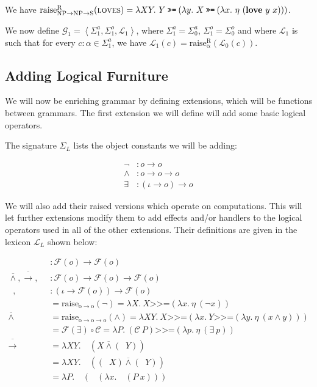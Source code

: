 \documentclass{article}
\newcommand{\hsbind}{\mathbin{\texttt{>>=}}}
\newcommand{\abs}[1]{\textsc{#1}}
\newcommand{\obj}[1]{\textbf{#1}}
\newcommand{\dand}{\mathbin{\overline{\land}}}
\newcommand{\dnot}{\mathop{\overline{\lnot}}}
\newcommand{\dor}{\mathop{\overline{\lor}}}
\newcommand{\dimpl}{\mathbin{\overline{\to}}}
\newcommand{\dexists}{\mathop{\overline{\exists}}}
\newcommand{\dforall}{\mathop{\overline{\forall}}}
\begin{document}
We have $\mathrm{raise^R_{NP \to NP \to S}}(\abs{loves}) = \lambda X
Y.\ Y \hsbind (\lambda y.\ X \hsbind (\lambda
x.\ \eta\ (\obj{love}\ y\ x)))$.

We now define $\mathcal{G}_1 = \left< \Sigma^a_1, \Sigma^o_1, \mathcal{L}_1
\right>$, where $\Sigma^a_1 = \Sigma^a_0$, $\Sigma^o_1 = \Sigma^o_0$ and
where $\mathcal{L}_1$ is such that for every $c : \alpha \in \Sigma^a_1$,
we have $\mathcal{L}_1(c) =
\mathrm{raise^R_\alpha}(\mathcal{L}_0(c))$.


\subsection{Adding Logical Furniture}

We will now be enriching grammar by defining extensions, which will be
functions between grammars. The first extension we will define will add
some basic logical operators.

The signature $\Sigma_L$ lists the object constants we will be
adding:

\begin{align*}
  \lnot &: o \to o \\
  \land &: o \to o \to o \\
  \exists &: (\iota \to o) \to o
\end{align*}

We will also add their raised versions which operate on computations. This
will let further extensions modify them to add effects and/or handlers to
the logical operators used in all of the other extensions. Their
definitions are given in the lexicon $\mathcal{L}_L$ shown below:

\begin{align*}
  \dnot &: \mathcal{F}(o) \to \mathcal{F}(o) \\
  \dand, \dimpl, \dor &: \mathcal{F}(o) \to \mathcal{F}(o) \to \mathcal{F}(o) \\
  \dexists, \dforall &: (\iota \to \mathcal{F}(o)) \to \mathcal{F}(o) \\
  \dnot &= \mathrm{raise_{o \to o}}(\lnot) = \lambda X.\ X \hsbind (\lambda x.\ \eta\ (\lnot x)) \\
  \dand &= \mathrm{raise_{o \to o \to o}}(\land) = \lambda X Y.\ X \hsbind (\lambda x.\ Y \hsbind (\lambda y.\ \eta\ (x \land y))) \\
  \dexists &= \mathcal{F}(\exists) \circ \mathcal{C} = \lambda P.\ (\mathcal{C}\ P) \hsbind (\lambda p.\ \eta\ (\exists\ p)) \\
  \dimpl &= \lambda X Y.\ \dnot\ (X \dand (\dnot Y)) \\
  \dor &= \lambda X Y.\ \dnot\ ((\dnot X) \dand (\dnot Y)) \\
  \dforall &= \lambda P.\ \dnot\ (\dexists\ (\lambda x.\ \dnot\ (P\ x)))
\end{align*}
\end{document}
